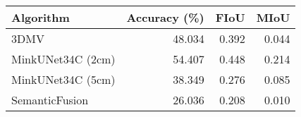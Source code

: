 \begin{tabular}{lrrr}
\toprule
Algorithm &  Accuracy (\%) &  FIoU &  MIoU \\
\midrule
3DMV              &        48.034 & 0.392 & 0.044 \\
MinkUNet34C (2cm) &        54.407 & 0.448 & 0.214 \\
MinkUNet34C (5cm) &        38.349 & 0.276 & 0.085 \\
SemanticFusion    &        26.036 & 0.208 & 0.010 \\
\bottomrule
\end{tabular}
